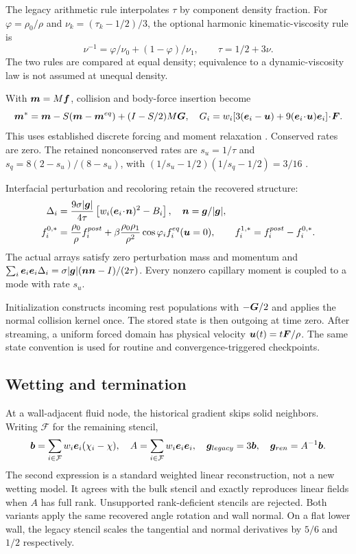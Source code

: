 The legacy arithmetic rule interpolates $\tau$ by component density fraction.
For $\varphi=\rho_0/\rho$ and $\nu_k=(\tau_k-1/2)/3$, the optional harmonic
kinematic-viscosity rule is
\begin{equation}
 \nu^{-1}=\varphi/\nu_0+(1-\varphi)/\nu_1,\qquad \tau=1/2+3\nu.
\end{equation}
The two rules are compared at equal density; equivalence to a dynamic-viscosity
law is not assumed at unequal density.

With $\bm{m}=M\bm{f}$, collision and body-force insertion become
\begin{equation}
 \bm{m}^*=\bm{m}-S(\bm{m}-\bm{m}^{eq})+(I-S/2)M\bm{G},
 \quad G_i=w_i[3(\bm{e}_i-\bm{u})+9(\bm{e}_i\!\cdot\!\bm{u})\bm{e}_i]\!\cdot\!\bm{F}.
\end{equation}
This uses established discrete forcing and moment relaxation
\cite{guo2002,lallemand2000}. Conserved rates are zero. The retained
nonconserved rates are $s_u=1/\tau$ and $s_q=8(2-s_u)/(8-s_u)$, with
$(1/s_u-1/2)(1/s_q-1/2)=3/16$ \cite{ginzburg2003}.

Interfacial perturbation and recoloring retain the recovered structure:
\begin{align}
 \Delta_i&=\frac{9\sigma |\bm{g}|}{4\tau}
 \left[w_i(\bm{e}_i\!\cdot\!\bm{n})^2-B_i\right],\quad
 \bm{n}=\bm{g}/|\bm{g}|,\\
 f_i^{0,*}&=\frac{\rho_0}{\rho}f_i^{post}+
 \beta\frac{\rho_0\rho_1}{\rho^2}\cos\varphi_i f_i^{eq}(\bm{u}=0),\qquad
 f_i^{1,*}=f_i^{post}-f_i^{0,*}.
\end{align}
The actual arrays satisfy zero perturbation mass and momentum and
$\sum_i\bm{e}_i\bm{e}_i\Delta_i=\sigma|\bm{g}|(\bm{n}\bm{n}-I)/(2\tau)$.
Every nonzero capillary moment is coupled to a mode with rate $s_u$.

Initialization constructs incoming rest populations with $-\bm{G}/2$ and
applies the normal collision kernel once. The stored state is then outgoing
at time zero. After streaming, a uniform forced domain has physical velocity
$\bm{u}(t)=t\bm{F}/\rho$. The same state convention is used for routine and
convergence-triggered checkpoints.

\subsection{Wetting and termination}
At a wall-adjacent fluid node, the historical gradient skips solid neighbors.
Writing $\mathcal F$ for the remaining stencil,
\begin{equation}
 \bm{b}=\sum_{i\in\mathcal F}w_i\bm{e}_i(\chi_i-\chi),\quad
 A=\sum_{i\in\mathcal F}w_i\bm{e}_i\bm{e}_i,
 \quad\bm{g}_{legacy}=3\bm{b},\quad\bm{g}_{ren}=A^{-1}\bm{b}.
\end{equation}
The second expression is a standard weighted linear reconstruction, not a
new wetting model. It agrees with the bulk stencil and exactly reproduces
linear fields when $A$ has full rank. Unsupported rank-deficient stencils
are rejected. Both variants apply the same recovered angle rotation and
wall normal. On a flat lower wall, the legacy stencil scales the tangential
and normal derivatives by $5/6$ and $1/2$ respectively.

